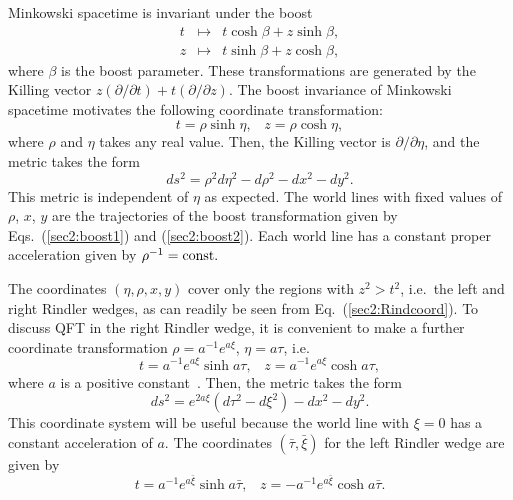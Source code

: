 \documentclass[12pt,nofootinbib,floatfix,aps,prd,showpacs,amsmath,amssymb,eqsecnum]{revtex4-2}
\let\cite\citep
\begin{document}
Minkowski spacetime is invariant under the boost
\begin{eqnarray}
t & \mapsto & t\cosh \beta + z\sinh\beta, \label{sec2:boost1}\\
z & \mapsto & t\sinh \beta + z \cosh \beta, \label{sec2:boost2}
\end{eqnarray}
where $\beta$ is the boost parameter. 
These transformations are generated by the
Killing vector
$z(\partial/\partial t) + t(\partial/\partial z)$.
The boost invariance of Minkowski spacetime
motivates the following coordinate transformation:
\begin{equation}
t  =  \rho\sinh\eta, \;\;\;
z  =  \rho\cosh\eta, 
\label{sec2:Rindcoord}
\end{equation}
where $\rho$ and $\eta$ takes any real value.  Then, the Killing vector
is $\partial/\partial\eta$, and the metric takes
the form
\begin{equation}
ds^2 = \rho^2d\eta^2 - d\rho^2 - dx^2 - dy^2. \label{sec2:RindlerRL}
\end{equation}
This metric is independent of $\eta$ as expected.  The world lines
with fixed values of $\rho$, $x$, $y$ are the trajectories of
the boost transformation given by Eqs.~(\ref{sec2:boost1}) and
(\ref{sec2:boost2}). Each world line has a constant proper
acceleration given by $\rho^{-1} = {\rm const}.$

The coordinates $(\eta,\rho,x,y)$ cover only the regions with $z^2 >
t^2$, i.e.~the left and right Rindler wedges,
as can readily be seen from Eq.~(\ref{sec2:Rindcoord}).  
To discuss QFT in the right
Rindler wedge, it is convenient to make a further coordinate
transformation $\rho = a^{-1}e^{a\xi}$, $\eta = a\tau$, i.e.
\begin{equation}
t = a^{-1}e^{a\xi}\sinh a\tau ,\;\;\;
z = a^{-1}e^{a\xi}\cosh a\tau,  
\label{sec2:rightcoords}
\end{equation}
where $a$ is a positive constant~\cite{Rindler66}.
Then, the metric takes the form
\begin{equation}
ds^2 = e^{2a\xi}(d\tau^2 - d\xi^2) - dx^2 - dy^2. 
\label{sec2:rightmetric}
\end{equation}
This coordinate system will be useful because the world line with $\xi=0$
has a constant acceleration of $a$.  
The coordinates $(\bar{\tau},\bar{\xi})$ for the left Rindler wedge
are given by
\begin{equation}
t = a^{-1}e^{a\bar{\xi}}\sinh a\bar{\tau},\;\;\;
z = - a^{-1}e^{a\bar{\xi}}\cosh a\bar{\tau}.
\label{sec2:leftcoords} 
\end{equation}
\end{document}
